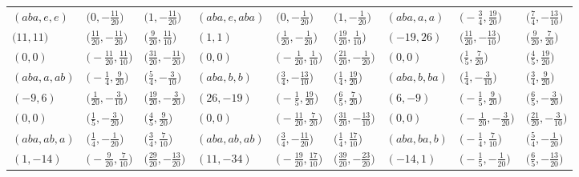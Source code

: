\documentclass[10pt,a4paper]{amsart}
\theoremstyle{definition}
\numberwithin{equation}{section}
\begin{document}
\begin{landscape}
\begin{table}[th]
\begin{tabular}{|lll|lll|lll|}
\\\hline
$(aba, e, e)$ & $\bigl(0, -\frac{11}{20}\bigr)$ & $\bigl(1, -\frac{11}{20}\bigr)$ & $(aba, e, aba)$ & $\bigl(0, -\frac{1}{20}\bigr)$ & $\bigl(1, -\frac{1}{20}\bigr)$ & $(aba, a, a)$ & $\bigl(-\frac{3}{4}, \frac{19}{20}\bigr)$ & $\bigl(\frac{7}{4}, -\frac{13}{10}\bigr)$
\\
$\bigl(11, 11\bigr)$ & $\bigl(\frac{11}{20}, -\frac{11}{20}\bigr)$ & $\bigl(\frac{9}{20}, \frac{11}{10}\bigr)$ & $(1, 1)$ & $\bigl(\frac{1}{20}, -\frac{1}{20}\bigr)$ & $\bigl(\frac{19}{20}, \frac{1}{10}\bigr)$ & $(-19, 26)$ & $\bigl(\frac{11}{20}, -\frac{13}{10}\bigr)$ & $\bigl(\frac{9}{20}, \frac{7}{20}\bigr)$
\\
$(0, 0)$ & $\bigl(-\frac{11}{20}, \frac{11}{10}\bigr)$ & $\bigl(\frac{31}{20}, -\frac{11}{20}\bigr)$ & $(0, 0)$ & $\bigl(-\frac{1}{20}, \frac{1}{10}\bigr)$ & $\bigl(\frac{21}{20}, -\frac{1}{20}\bigr)$ & $(0, 0)$ & $\bigl(\frac{1}{5}, \frac{7}{20}\bigr)$ & $\bigl(\frac{4}{5}, \frac{19}{20}\bigr)$
\\\hline
$(aba, a, ab)$ & $\bigl(-\frac{1}{4}, \frac{9}{20}\bigr)$ & $\bigl(\frac{5}{4}, -\frac{3}{10}\bigr)$ & $(aba, b, b)$ & $\bigl(\frac{3}{4}, -\frac{13}{10}\bigr)$ & $\bigl(\frac{1}{4}, \frac{19}{20}\bigr)$ & $(aba, b, ba)$ & $\bigl(\frac{1}{4}, -\frac{3}{10}\bigr)$ & $\bigl(\frac{3}{4}, \frac{9}{20}\bigr)$
 \\
$(-9, 6)$ & $\bigl(\frac{1}{20}, -\frac{3}{10}\bigr)$ & $\bigl(\frac{19}{20}, -\frac{3}{20}\bigr)$ & $(26, -19)$ & $\bigl(-\frac{1}{5}, \frac{19}{20}\bigr)$ & $\bigl(\frac{6}{5}, \frac{7}{20}\bigr)$ & $(6, -9)$ & $\bigl(-\frac{1}{5}, \frac{9}{20}\bigr)$ & $\bigl(\frac{6}{5}, -\frac{3}{20}\bigr)$
\\
$(0, 0)$ & $\bigl(\frac{1}{5}, -\frac{3}{20}\bigr)$ & $\bigl(\frac{4}{5}, \frac{9}{20}\bigr)$ & $(0, 0)$ & $\bigl(-\frac{11}{20}, \frac{7}{20}\bigr)$ & $\bigl(\frac{31}{20}, -\frac{13}{10}\bigr)$ & $(0, 0)$ & $\bigl(-\frac{1}{20}, -\frac{3}{20}\bigr)$ & $\bigl(\frac{21}{20}, -\frac{3}{10}\bigr)$
\\\hline
$(aba, ab, a)$ & $\bigl(\frac{1}{4}, -\frac{1}{20}\bigr)$ & $\bigl(\frac{3}{4}, \frac{7}{10}\bigr)$ & $(aba, ab, ab)$ & $\bigl(\frac{3}{4}, -\frac{11}{20}\bigr)$ & $\bigl(\frac{1}{4}, \frac{17}{10}\bigr)$ & $(aba, ba, b)$ & $\bigl(-\frac{1}{4}, \frac{7}{10}\bigr)$ & $\bigl(\frac{5}{4}, -\frac{1}{20}\bigr)$
\\
$(1, -14)$ & $\bigl(-\frac{9}{20}, \frac{7}{10}\bigr)$ & $\bigl(\frac{29}{20}, -\frac{13}{20}\bigr)$ & $(11, -34)$ & $\bigl(-\frac{19}{20}, \frac{17}{10}\bigr)$ & $\bigl(\frac{39}{20}, -\frac{23}{20}\bigr)$ & $(-14, 1)$ & $\bigl(-\frac{1}{5}, -\frac{1}{20}\bigr)$ & $\bigl(\frac{6}{5}, -\frac{13}{20}\bigr)$

\end{tabular}
\end{table}
\end{landscape}
\end{document}
